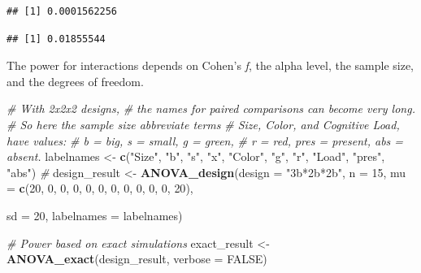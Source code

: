 \documentclass[]{book}
\newenvironment{Shaded}{\begin{snugshade}}{\end{snugshade}}
\newcommand{\CommentTok}[1]{\textcolor[rgb]{0.56,0.35,0.01}{\textit{#1}}}
\newcommand{\DataTypeTok}[1]{\textcolor[rgb]{0.13,0.29,0.53}{#1}}
\newcommand{\DecValTok}[1]{\textcolor[rgb]{0.00,0.00,0.81}{#1}}
\newcommand{\KeywordTok}[1]{\textcolor[rgb]{0.13,0.29,0.53}{\textbf{#1}}}
\newcommand{\NormalTok}[1]{#1}
\newcommand{\OperatorTok}[1]{\textcolor[rgb]{0.81,0.36,0.00}{\textbf{#1}}}
\newcommand{\OtherTok}[1]{\textcolor[rgb]{0.56,0.35,0.01}{#1}}
\newcommand{\StringTok}[1]{\textcolor[rgb]{0.31,0.60,0.02}{#1}}
\begin{document}
\begin{Shaded}
\end{Shaded}

\begin{verbatim}
## [1] 0.0001562256
\end{verbatim}

\begin{Shaded}
\end{Shaded}

\begin{verbatim}
## [1] 0.01855544
\end{verbatim}

The power for interactions depends on Cohen's \emph{f}, the alpha level, the sample size, and the degrees of freedom.

\begin{Shaded}
\begin{Highlighting}[]
\CommentTok{# With 2x2x2 designs, }
\CommentTok{# the names for paired comparisons can become very long. }
\CommentTok{# So here the sample size abbreviate terms}
\CommentTok{# Size, Color, and Cognitive Load, have values:}
\CommentTok{# b = big, s = small, g = green, }
\CommentTok{# r = red, pres = present, abs = absent.  }
\NormalTok{labelnames <-}\StringTok{ }\KeywordTok{c}\NormalTok{(}\StringTok{"Size"}\NormalTok{, }\StringTok{"b"}\NormalTok{, }\StringTok{"s"}\NormalTok{, }\StringTok{"x"}\NormalTok{, }\StringTok{"Color"}\NormalTok{, }\StringTok{"g"}\NormalTok{, }\StringTok{"r"}\NormalTok{, }
                \StringTok{"Load"}\NormalTok{, }\StringTok{"pres"}\NormalTok{, }\StringTok{"abs"}\NormalTok{) }\CommentTok{#}
\NormalTok{design_result <-}\StringTok{ }\KeywordTok{ANOVA_design}\NormalTok{(}\DataTypeTok{design =} \StringTok{"3b*2b*2b"}\NormalTok{, }
                              \DataTypeTok{n =} \DecValTok{15}\NormalTok{, }
                              \DataTypeTok{mu =} \KeywordTok{c}\NormalTok{(}\DecValTok{20}\NormalTok{, }\DecValTok{0}\NormalTok{, }\DecValTok{0}\NormalTok{, }\DecValTok{0}\NormalTok{, }\DecValTok{0}\NormalTok{, }
                                     \DecValTok{0}\NormalTok{, }\DecValTok{0}\NormalTok{, }\DecValTok{0}\NormalTok{, }\DecValTok{0}\NormalTok{, }\DecValTok{0}\NormalTok{, }\DecValTok{0}\NormalTok{, }\DecValTok{20}\NormalTok{), }
                              
                              \DataTypeTok{sd =} \DecValTok{20}\NormalTok{, }
                              \DataTypeTok{labelnames =}\NormalTok{ labelnames) }

\CommentTok{# Power based on exact simulations}
\NormalTok{exact_result <-}\StringTok{ }\KeywordTok{ANOVA_exact}\NormalTok{(design_result,}
                            \DataTypeTok{verbose =} \OtherTok{FALSE}\NormalTok{)}
\end{Highlighting}
\end{Shaded}
\end{document}
